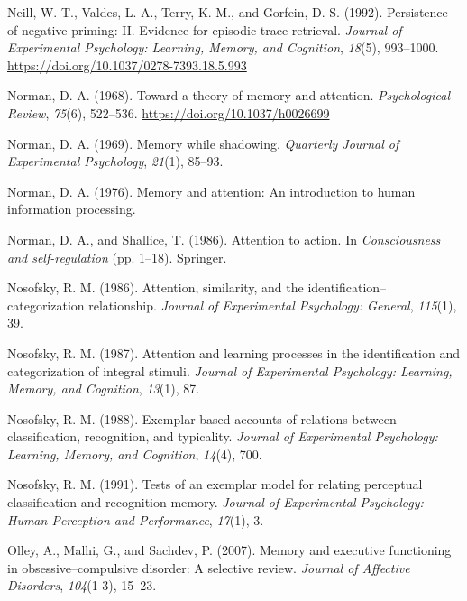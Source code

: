 \documentclass[]{DissertateCUNY}
\begin{document}
\leavevmode\hypertarget{ref-neill_persistence_1992}{}%
Neill, W. T., Valdes, L. A., Terry, K. M., and Gorfein, D. S. (1992).
Persistence of negative priming: II. Evidence for episodic trace
retrieval. \emph{Journal of Experimental Psychology: Learning, Memory,
and Cognition}, \emph{18}(5), 993--1000.
\url{https://doi.org/10.1037/0278-7393.18.5.993}

\leavevmode\hypertarget{ref-norman_toward_1968}{}%
Norman, D. A. (1968). Toward a theory of memory and attention.
\emph{Psychological Review}, \emph{75}(6), 522--536.
\url{https://doi.org/10.1037/h0026699}

\leavevmode\hypertarget{ref-norman_memory_1969}{}%
Norman, D. A. (1969). Memory while shadowing. \emph{Quarterly Journal of
Experimental Psychology}, \emph{21}(1), 85--93.

\leavevmode\hypertarget{ref-norman_memory_1976}{}%
Norman, D. A. (1976). Memory and attention: An introduction to human
information processing.

\leavevmode\hypertarget{ref-norman_attention_1986}{}%
Norman, D. A., and Shallice, T. (1986). Attention to action. In
\emph{Consciousness and self-regulation} (pp. 1--18). Springer.

\leavevmode\hypertarget{ref-nosofsky_attention_1986}{}%
Nosofsky, R. M. (1986). Attention, similarity, and the
identification--categorization relationship. \emph{Journal of
Experimental Psychology: General}, \emph{115}(1), 39.

\leavevmode\hypertarget{ref-nosofsky_attention_1987}{}%
Nosofsky, R. M. (1987). Attention and learning processes in the
identification and categorization of integral stimuli. \emph{Journal of
Experimental Psychology: Learning, Memory, and Cognition}, \emph{13}(1),
87.

\leavevmode\hypertarget{ref-nosofsky_exemplar-based_1988}{}%
Nosofsky, R. M. (1988). Exemplar-based accounts of relations between
classification, recognition, and typicality. \emph{Journal of
Experimental Psychology: Learning, Memory, and Cognition}, \emph{14}(4),
700.

\leavevmode\hypertarget{ref-nosofsky_tests_1991}{}%
Nosofsky, R. M. (1991). Tests of an exemplar model for relating
perceptual classification and recognition memory. \emph{Journal of
Experimental Psychology: Human Perception and Performance},
\emph{17}(1), 3.

\leavevmode\hypertarget{ref-olley_memory_2007}{}%
Olley, A., Malhi, G., and Sachdev, P. (2007). Memory and executive
functioning in obsessive--compulsive disorder: A selective review.
\emph{Journal of Affective Disorders}, \emph{104}(1-3), 15--23.
\end{document}
